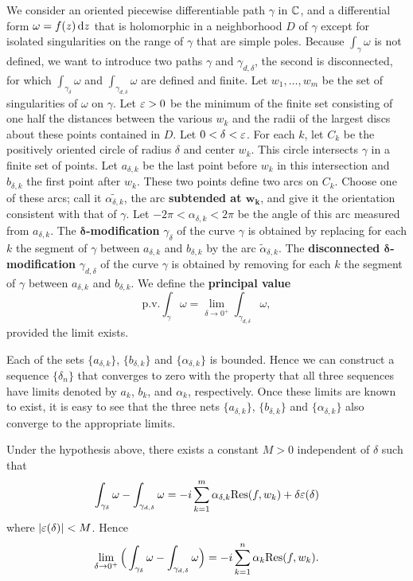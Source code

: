 We consider an oriented piecewise differentiable path $\gamma$ in $\mathbb{C}$, and a differential form $\omega=f(z)\mathop{}\!\mathrm{d} z$ that is holomorphic in a neighborhood $D$ of $\gamma$ except for isolated singularities on the range of $\gamma$ that are simple poles. Because $\int_{\gamma}\omega$ is not defined, we want to introduce two paths $\gamma$ and $\gamma_{d,\delta}$, the second is disconnected, for which $\int_{\gamma_{\delta}}\omega$ and $\int_{\gamma_{d,\delta}}\omega$ are defined and finite. Let $w_1,\dots,w_m$ be the set of singularities of $\omega$ on $\gamma$. Let $\varepsilon>0$ be the minimum of the finite set consisting of one half the distances between the various $w_k$ and the radii of the largest discs about these points contained in $D$. Let $0<\delta<\varepsilon$. For each $k$, let $C_k$ be the positively oriented circle of radius $\delta$ and center $w_k$. This circle intersects $\gamma$ in a finite set of points. Let $a_{\delta,k}$ be the last point before $w_k$ in this intersection and $b_{\delta,k}$ the first point after $w_k$. These two points define two arcs on $C_k$. Choose one of these arcs; call it $\widetilde{\alpha_{\delta,k}}$, the arc \textbf{subtended at $\bm{w_k}$}, and give it the orientation consistent with that of $\gamma$. Let $-2\pi<\alpha_{\delta,k}<2\pi$ be the angle of this arc measured from $a_{\delta,k}$. The \textbf{$\bm{\delta}$-modification} $\gamma_{\delta}$ of the curve $\gamma$ is obtained by replacing for each $k$ the segment of $\gamma$ between $a_{\delta,k}$ and $b_{\delta,k}$ by the arc $\widetilde{\alpha}_{\delta,k}$. The \textbf{disconnected $\bm{\delta}$-modification} $\gamma_{d,\delta}$ of the curve $\gamma$ is obtained by removing for each $k$ the segment of $\gamma$ between $a_{\delta,k}$ and $b_{\delta,k}$. We define the \textbf{principal value}
\[\text{p.v.}\int_{\gamma}\omega=\lim_{\delta\to 0^+}\int_{\gamma_{d,\delta}}\omega,\]
provided the limit exists.\par
Each of the sets $\{a_{\delta,k}\}$, $\{b_{\delta,k}\}$ and $\{\alpha_{\delta,k}\}$ is bounded. Hence we can construct a sequence $\{\delta_n\}$ that converges to zero with the property that all three sequences have limits denoted by $a_k$, $b_k$, and $\alpha_k$, respectively. Once these limits are known to exist, it is easy to see that the three nets $\{a_{\delta,k}\}$, $\{b_{\delta,k}\}$ and $\{\alpha_{\delta,k}\}$ also converge to the appropriate limits.
\begin{lemma}
Under the hypothesis above, there exists a constant $M>0$ independent of $\delta$ such that
\[\int_{\gamma_{\delta}}\omega-\int_{\gamma_{d,\delta}}\omega=-i\sum_{k=1}^{m}\alpha_{\delta,k}\mathrm{Res}(f,w_k)+\delta\varepsilon(\delta)\]
where $|\varepsilon(\delta)|<M$. Hence
\begin{align}\label{Cauchy integral with sigularity on path}
\lim_{\delta\to 0^+}\Big(\int_{\gamma_{\delta}}\omega-\int_{\gamma_{d,\delta}}\omega\Big)=-i\sum_{k=1}^{n}\alpha_{k}\mathrm{Res}(f,w_k).
\end{align}
\end{lemma}
